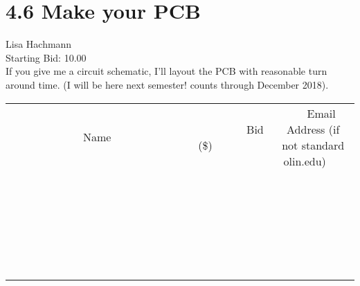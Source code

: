 \documentclass[11pt]{article}
\begin{document}
					\section*{4.6 Make your PCB}
					Lisa Hachmann \\
					Starting Bid: 10.00 \\
					If you give me a circuit schematic, I'll layout the PCB with reasonable turn around time. (I will be here next semester! counts through December 2018). \\
					[6ex]
					\begin{tabular}{c c c}
						~~~~~~~~~~~~~Name~~~~~~~~~~~~~ & ~~~~~~~~~Bid (\$)~~~~~~~~~ & ~~~Email Address (if not standard olin.edu)~~~ \\
				
 & & \\
\hline
 & & \\
\hline
 & & \\
\hline
 & & \\
\hline
 & & \\
\hline
 & & \\
\hline
 & & \\
\hline
 & & \\
\hline
 & & \\
\hline
 & & \\
\hline
 & & \\
\hline
 & & \\
\hline
 & & \\
\hline
 & & \\
\hline
 & & \\
\hline
 & & \\
\hline
 & & \\
\hline
 & & \\
\hline
 & & \\
\hline
 & & \\
\hline
 & & \\
\hline
 & & \\
\hline
 & & \\
\hline
 & & \\
\hline
 & & \\
\hline
 & & \\
\hline
					\end{tabular}
					\clearpage
				
\end{document}
